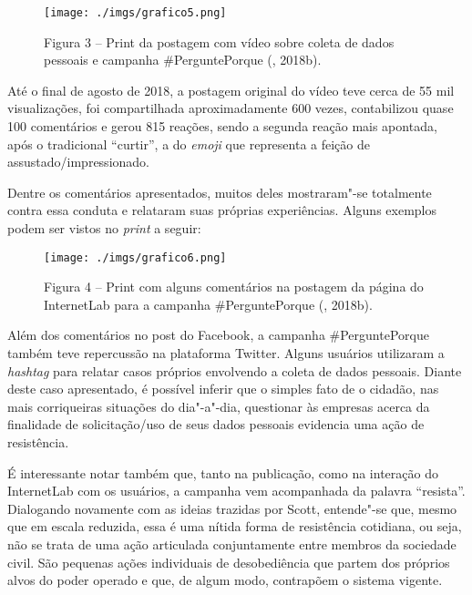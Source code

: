 \begin{figure}[!ht]
\centering
  \texttt{[image: ./imgs/grafico5.png]}
\parbox{225pt}{\caption{Figura 3 -- Print da postagem com vídeo sobre coleta de dados pessoais e campanha \#PerguntePorque (, 2018b).}}
 \end{figure}

Até o final de agosto de 2018, a postagem original do vídeo teve cerca
de 55 mil visualizações, foi compartilhada aproximadamente 600 vezes,
contabilizou quase 100 comentários e gerou 815 reações, sendo a segunda
reação mais apontada, após o tradicional ``curtir'', a do \emph{emoji}
que representa a feição de assustado/impressionado.

Dentre os comentários apresentados, muitos deles mostraram"-se totalmente
contra essa conduta e relataram suas próprias experiências. Alguns
exemplos podem ser vistos no \emph{print} a seguir:

\begin{figure}[!ht]
\centering
  \texttt{[image: ./imgs/grafico6.png]}
\parbox{225pt}{\caption{Figura 4 -- Print com alguns comentários na postagem da página do InternetLab para a campanha \#PerguntePorque (, 2018b).}}
 \end{figure}

Além dos comentários no post do Facebook, a campanha \#PerguntePorque
também teve repercussão na plataforma Twitter. Alguns usuários
utilizaram a \emph{hashtag} para relatar casos próprios envolvendo a
coleta de dados pessoais. Diante deste caso apresentado, é possível
inferir que o simples fato de o cidadão, nas mais corriqueiras situações
do dia"-a"-dia, questionar às empresas acerca da finalidade de
solicitação/uso de seus dados pessoais evidencia uma ação de
resistência.

É interessante notar também que, tanto na publicação, como na interação
do InternetLab com os usuários, a campanha vem acompanhada da palavra
``resista''. Dialogando novamente com as ideias trazidas por Scott,
entende"-se que, mesmo que em escala reduzida, essa é uma nítida forma de
resistência cotidiana, ou seja, não se trata de uma ação articulada
conjuntamente entre membros da sociedade civil. São pequenas ações
individuais de desobediência que partem dos próprios alvos do poder
operado e que, de algum modo, contrapõem o sistema vigente.

